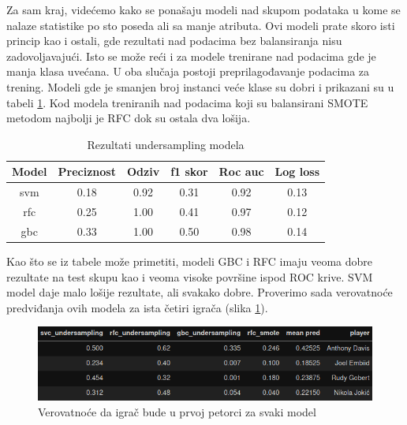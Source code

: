 \documentclass[a4paper]{article}
\begin{document}
Za sam kraj, videćemo kako se ponašaju modeli nad skupom podataka u kome se nalaze statistike po sto poseda ali sa manje atributa. Ovi modeli prate skoro isti princip kao i ostali, gde rezultati nad podacima bez balansiranja nisu zadovoljavajući. Isto se može reći i za modele trenirane nad podacima gde je manja klasa uvećana. U oba slučaja postoji preprilagođavanje podacima za trening. Modeli gde je smanjen broj instanci veće klase su dobri i prikazani su u tabeli \ref{tab:undersampling_pp_simple}. Kod modela treniranih nad podacima koji su balansirani SMOTE metodom najbolji je RFC dok su ostala dva lošija.

\begin{table}[!h]
\begin{center}
\begin{tabular}{|c|c|c|c|c|c|} \hline
\textbf{Model} & \textbf{Preciznost} & \textbf{Odziv} & \textbf{f1 skor} & \textbf{Roc auc} & \textbf{Log loss} \\ \hline
svm & 0.18 & 0.92 & 0.31 & 0.92 & 0.13 \\ \hline
rfc & 0.25 & 1.00 & 0.41 & 0.97 & 0.12 \\ \hline
gbc & 0.33 & 1.00 & 0.50 & 0.98 & 0.14 \\ \hline
\end{tabular}
\caption{Rezultati undersampling modela}
\label{tab:undersampling_pp_simple}
\end{center}
\end{table}

Kao što se iz tabele može primetiti, modeli GBC i RFC imaju veoma dobre rezultate na test skupu kao i veoma visoke površine ispod ROC krive. SVM model daje malo lošije rezultate, ali svakako dobre. Proverimo sada verovatnoće predviđanja ovih modela za ista četiri igrača (slika \ref{plt:clf_pp_simpler}).

\begin{figure}[h!]
\begin{center}
\includegraphics[scale=0.50]{clf_pp_simpler.png}
\end{center}
\caption{Verovatnoće da igrač bude u prvoj petorci za svaki model}
\label{plt:clf_pp_simpler}
\end{figure}
\end{document}
